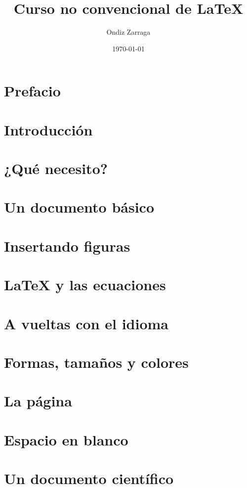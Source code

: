 \documentclass[a4paper,10pt]{book}
\title{Curso no convencional de \LaTeX}
\author{Ondiz Zarraga}
\date{\today}
\begin{document}
\frontmatter
\maketitle

\tableofcontents

\chapter*{Prefacio}


\mainmatter

\chapter{Introducción}


\chapter{¿Qué necesito?}


\chapter{Un documento básico}


\chapter{Insertando figuras}


\chapter{LaTeX y las ecuaciones}


\chapter{A vueltas con el idioma}\label{ch:idioma}


\chapter{Formas, tamaños y colores}


\chapter{La página}


\chapter{Espacio en blanco}\label{ch:blanco}


\chapter{Un documento científico}


\backmatter


% 
%
\end{document}
